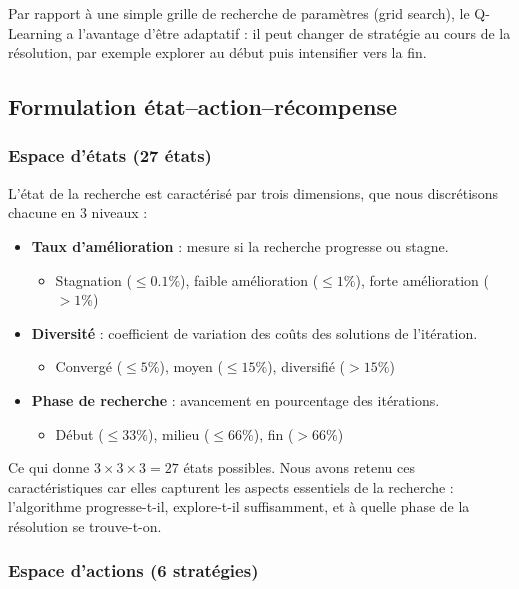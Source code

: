 \documentclass[12pt, a4paper]{article}
\begin{document}
Par rapport à une simple grille de recherche de paramètres (grid search), le Q-Learning a l'avantage d'être adaptatif : il peut changer de stratégie au cours de la résolution, par exemple explorer au début puis intensifier vers la fin.

\subsection{Formulation état--action--récompense}

\subsubsection{Espace d'états (27 états)}

L'état de la recherche est caractérisé par trois dimensions, que nous discrétisons chacune en 3 niveaux :

\begin{itemize}
    \item \textbf{Taux d'amélioration} : mesure si la recherche progresse ou stagne.
    \begin{itemize}
        \item Stagnation ($\leq 0.1\%$), faible amélioration ($\leq 1\%$), forte amélioration ($> 1\%$)
    \end{itemize}
    \item \textbf{Diversité} : coefficient de variation des coûts des solutions de l'itération.
    \begin{itemize}
        \item Convergé ($\leq 5\%$), moyen ($\leq 15\%$), diversifié ($> 15\%$)
    \end{itemize}
    \item \textbf{Phase de recherche} : avancement en pourcentage des itérations.
    \begin{itemize}
        \item Début ($\leq 33\%$), milieu ($\leq 66\%$), fin ($> 66\%$)
    \end{itemize}
\end{itemize}

Ce qui donne $3 \times 3 \times 3 = 27$ états possibles. Nous avons retenu ces caractéristiques car elles capturent les aspects essentiels de la recherche : l'algorithme progresse-t-il, explore-t-il suffisamment, et à quelle phase de la résolution se trouve-t-on.

\subsubsection{Espace d'actions (6 stratégies)}
\end{document}
